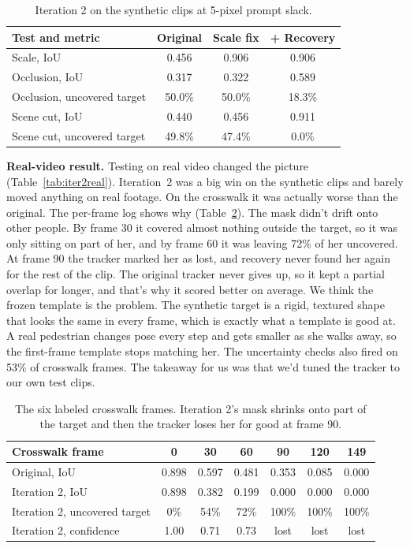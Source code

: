 \begin{table}[h]
\centering\small
\begin{tabular}{lccc}
\toprule
Test and metric & Original & Scale fix & + Recovery \\
\midrule
Scale, IoU & 0.456 & 0.906 & 0.906 \\
Occlusion, IoU & 0.317 & 0.322 & 0.589 \\
Occlusion, uncovered target & 50.0\% & 50.0\% & 18.3\% \\
Scene cut, IoU & 0.440 & 0.456 & 0.911 \\
Scene cut, uncovered target & 49.8\% & 47.4\% & 0.0\% \\
\bottomrule
\end{tabular}
\caption{Iteration 2 on the synthetic clips at 5-pixel prompt slack.}
\label{tab:iter2}
\end{table}

\textbf{Real-video result.} Testing on real video changed the picture (Table~\ref{tab:iter2real}).
Iteration~2 was a big win on the synthetic clips and barely moved anything on real footage. On the
crosswalk it was actually worse than the original. The per-frame log shows why
(Table~\ref{tab:crosswalk-frames}). The mask didn't drift onto other people. By frame 30 it covered
almost nothing outside the target, so it was only sitting on part of her, and by frame 60 it was
leaving 72\% of her uncovered. At frame 90 the tracker marked her as lost, and recovery never found
her again for the rest of the clip. The original tracker never gives up, so it kept a partial
overlap for longer, and that's why it scored better on average. We think the frozen template is the
problem. The synthetic target is a rigid, textured shape that looks the same in every frame, which
is exactly what a template is good at. A real pedestrian changes pose every step and gets smaller
as she walks away, so the first-frame template stops matching her. The uncertainty checks also fired
on 53\% of crosswalk frames. The takeaway for us was that we'd tuned the tracker to our own test
clips.

\begin{table}[h]
\centering\small
\begin{tabular}{lcccccc}
\toprule
Crosswalk frame & 0 & 30 & 60 & 90 & 120 & 149 \\
\midrule
Original, IoU & 0.898 & 0.597 & 0.481 & 0.353 & 0.085 & 0.000 \\
Iteration 2, IoU & 0.898 & 0.382 & 0.199 & 0.000 & 0.000 & 0.000 \\
Iteration 2, uncovered target & 0\% & 54\% & 72\% & 100\% & 100\% & 100\% \\
Iteration 2, confidence & 1.00 & 0.71 & 0.73 & lost & lost & lost \\
\bottomrule
\end{tabular}
\caption{The six labeled crosswalk frames. Iteration 2's mask shrinks onto part of the target and
then the tracker loses her for good at frame 90.}
\label{tab:crosswalk-frames}
\end{table}

